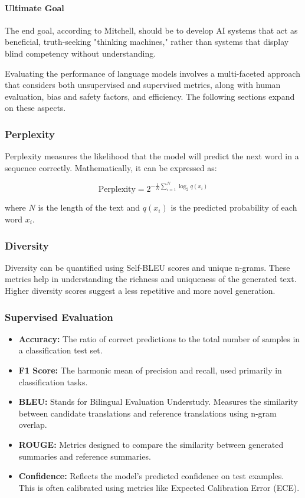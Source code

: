 \paragraph{Ultimate Goal}
The end goal, according to Mitchell, should be to develop AI systems that act as beneficial, truth-seeking "thinking machines," rather than systems that display blind competency without understanding.


Evaluating the performance of language models involves a multi-faceted approach that considers both unsupervised and supervised metrics, along with human evaluation, bias and safety factors, and efficiency. The following sections expand on these aspects.

\subsubsection{Perplexity}

Perplexity measures the likelihood that the model will predict the next word in a sequence correctly. Mathematically, it can be expressed as:

\[
\text{Perplexity} = 2^{-\frac{1}{N}\sum_{i=1}^{N}\log_2 q(x_i)}
\]

where \( N \) is the length of the text and \( q(x_i) \) is the predicted probability of each word \( x_i \).

\subsubsection{Diversity}

Diversity can be quantified using Self-BLEU scores and unique n-grams. These metrics help in understanding the richness and uniqueness of the generated text. Higher diversity scores suggest a less repetitive and more novel generation.

\subsubsection{Supervised Evaluation}

\begin{itemize}
    \item \textbf{Accuracy:} The ratio of correct predictions to the total number of samples in a classification test set.
    \item \textbf{F1 Score:} The harmonic mean of precision and recall, used primarily in classification tasks.
    \item \textbf{BLEU:} Stands for Bilingual Evaluation Understudy. Measures the similarity between candidate translations and reference translations using n-gram overlap.
    \item \textbf{ROUGE:} Metrics designed to compare the similarity between generated summaries and reference summaries.
    \item \textbf{Confidence:} Reflects the model's predicted confidence on test examples. This is often calibrated using metrics like Expected Calibration Error (ECE).
\end{itemize}

